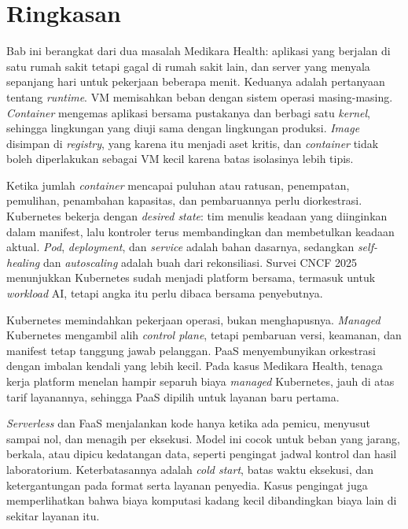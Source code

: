 \section{Ringkasan}

Bab ini berangkat dari dua masalah Medikara Health: aplikasi yang berjalan di satu rumah sakit
tetapi gagal di rumah sakit lain, dan server yang menyala sepanjang hari untuk pekerjaan beberapa
menit. Keduanya adalah pertanyaan tentang \textit{runtime}. VM memisahkan beban dengan sistem
operasi masing-masing. \textit{Container} mengemas aplikasi bersama pustakanya dan berbagi satu
\textit{kernel}, sehingga lingkungan yang diuji sama dengan lingkungan produksi. \textit{Image}
disimpan di \textit{registry}, yang karena itu menjadi aset kritis, dan \textit{container} tidak
boleh diperlakukan sebagai VM kecil karena batas isolasinya lebih tipis.

Ketika jumlah \textit{container} mencapai puluhan atau ratusan, penempatan, pemulihan, penambahan
kapasitas, dan pembaruannya perlu diorkestrasi. Kubernetes bekerja dengan \textit{desired state}:
tim menulis keadaan yang diinginkan dalam manifest, lalu kontroler terus membandingkan dan
membetulkan keadaan aktual. \textit{Pod}, \textit{deployment}, dan \textit{service} adalah bahan
dasarnya, sedangkan \textit{self-healing} dan \textit{autoscaling} adalah buah dari rekonsiliasi.
Survei CNCF 2025 menunjukkan Kubernetes sudah menjadi platform bersama, termasuk untuk
\textit{workload} AI, tetapi angka itu perlu dibaca bersama penyebutnya.

Kubernetes memindahkan pekerjaan operasi, bukan menghapusnya. \textit{Managed} Kubernetes mengambil
alih \textit{control plane}, tetapi pembaruan versi, keamanan, dan manifest tetap tanggung jawab
pelanggan. PaaS menyembunyikan orkestrasi dengan imbalan kendali yang lebih kecil. Pada kasus
Medikara Health, tenaga kerja platform menelan hampir separuh biaya \textit{managed} Kubernetes,
jauh di atas tarif layanannya, sehingga PaaS dipilih untuk layanan baru pertama.

\textit{Serverless} dan FaaS menjalankan kode hanya ketika ada pemicu, menyusut sampai nol, dan
menagih per eksekusi. Model ini cocok untuk beban yang jarang, berkala, atau dipicu kedatangan
data, seperti pengingat jadwal kontrol dan hasil laboratorium. Keterbatasannya adalah \textit{cold
start}, batas waktu eksekusi, dan ketergantungan pada format serta layanan penyedia. Kasus
pengingat juga memperlihatkan bahwa biaya komputasi kadang kecil dibandingkan biaya lain di sekitar
layanan itu.

